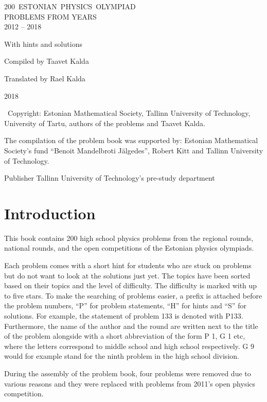 \documentclass[11pt]{article}
\begin{document}

\begin{titlepage}
	\centering
	\vspace{10cm}
	{\sffamily\Huge \mbox{200 ESTONIAN PHYSICS OLYMPIAD}\\ PROBLEMS FROM YEARS\\ 2012 -- 2018\par}
	\vspace{1cm}
	{\Large With hints and solutions\par}
	\vfill
	{\Large Compiled by Taavet Kalda\par}
	\vspace{1cm}
	{\Large Translated by Rael Kalda}

	\vfill

	{\large 2018}
\end{titlepage}

\addtocounter{page}{1}
\mbox{}\vfill

\textcopyright~Copyright: Estonian Mathematical Society, Tallinn University of Technology,
University of Tartu, authors of the problems and Taavet Kalda.
\vspace{0.5\baselineskip}

The compilation of the problem book was supported by: Estonian Mathematical Society's fund ``Benoit Mandelbroti Jälgedes'', Robert Kitt and Tallinn University of Technology.
\vspace{0.5\baselineskip}

Publisher Tallinn University of Technology's pre-study department
\newpage

\tableofcontents
\newpage

{\setlength{\parindent}{24pt}
\section{Introduction}

This book contains 200 high school physics problems from the regional rounds, national rounds, and the open competitions of the Estonian physics olympiads.

Each problem comes with a short hint for students who are stuck on problems but do not want to look at the solutions just yet. The topics have been sorted based on their topics and the level of difficulty. The difficulty is marked with up to five stars. To make the searching of problems easier, a prefix is attached before the problem numbers, \enquote{P} for problem statements, \enquote{H} for hints and \enquote{S} for solutions. For example, the statement of problem 133 is denoted with P133. Furthermore, the name of the author and the round are written next to the title of the problem alongside with a short abbreviation of the form P 1, G 1 etc, where the letters correspond to middle school and high school respectively. G 9 would for example stand for the ninth problem in the high school division.

During the assembly of the problem book, four problems were removed due to various reasons and they were replaced with problems from 2011's open physics competition.}
\newpage
\setlength{\parindent}{0pt}
\end{document}
